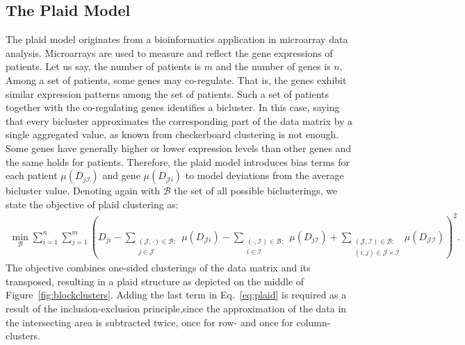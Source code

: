 \subsection{The Plaid Model}
The plaid model originates from a bioinformatics application in microarray data analysis. Microarrays are used to measure and reflect the gene expressions of patients. Let us say, the number of patients is $m$ and the number of genes is $n$. Among a set of patients, some genes may co-regulate. That is, the genes exhibit similar expression patterns among the set of patients. Such a set of patients together with the co-regulating genes identifies a bicluster. In this case, saying that every bicluster approximates the corresponding part of the data matrix by a single aggregated value, as known from checkerboard clustering is not enough. Some genes have generally higher or lower expression levels than other genes and the same holds for patients. Therefore, the plaid model introduces bias terms for each patient $\mu(D_{j\mathcal{I}})$ and gene $\mu(D_{\mathcal{J}i})$ to model deviations from the average bicluster value. Denoting again with $\mathcal{B}$ the set of all possible biclusterings, we state the objective of plaid clustering as:
\begin{align}
   \min_{\mathcal{B}} \sum_{i=1}^n\sum_{j=1}^m \left(D_{ji}-\sum_{\substack{(\mathcal{J},\cdot)\in\mathcal{B}:\\  j\in\mathcal{J}}}\mu(D_{\mathcal{J}i}) - \sum_{\substack{(\cdot,\mathcal{I})\in\mathcal{B}:\\  i\in\mathcal{I}}} \mu(D_{j\mathcal{I}})+ \sum_{\substack{(\mathcal{J},\mathcal{I})\in\mathcal{B}:\\  (i,j)\in\mathcal{J}\times\mathcal{I}}} \mu(D_{\mathcal{JI}})\right)^2. \label{eq:plaid}
\end{align}
The objective combines one-sided clusterings of the data matrix and its transposed, resulting in a plaid structure as depicted on the middle of Figure~\ref{fig:blockclusters}. Adding the last term in Eq.~\eqref{eq:plaid} is required as a result of the inclusion-exclusion principle,since the approximation of the data in the intersecting area is subtracted twice, once for row- and once for column- clusters. 

